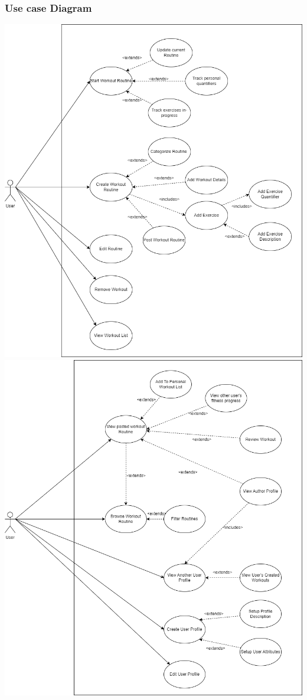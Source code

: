 \documentclass[12pt]{article}
\begin{document}
\subsubsection{Use case Diagram}
\includegraphics[scale=0.5]{srs_usecase_diagram_routines}
\newpage
\includegraphics[scale=0.5]{srs_usecase_diagram_profiles}
\end{document}
